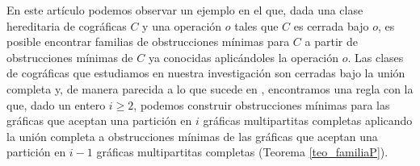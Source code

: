 En este artículo podemos observar un ejemplo en el que, dada
una clase hereditaria de cográficas $C$ y una operación
$o$ tales que $C$ es cerrada bajo $o$, es posible encontrar
familias de obstrucciones mínimas para $C$ a partir de
obstrucciones mínimas de $C$ ya conocidas aplic\'andoles
la operación $o$. Las clases de cográficas que estudiamos en
nuestra investigación son cerradas bajo la unión completa y,
de manera parecida a lo que sucede en \cite{Hell03},
encontramos una regla con la que, dado un entero $i \ge 2$,
podemos construir obstrucciones mínimas para las gráficas que
aceptan una partición en $i$ gráficas multipartitas completas
aplicando la unión completa a obstrucciones mínimas de las
gráficas que aceptan una partición en $i-1$ gráficas multipartitas
completas (Teorema \ref{teo_familiaP}).

